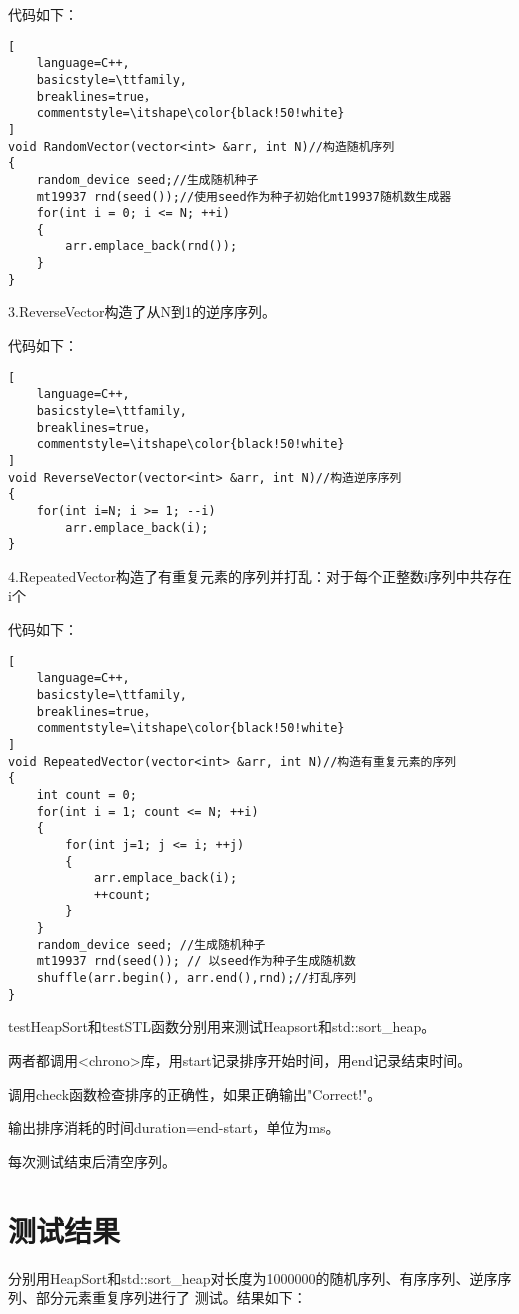 \documentclass[UTF8]{ctexart}
\begin{document}
代码如下：

\begin{lstlisting}[
    language=C++,
    basicstyle=\ttfamily,
    breaklines=true，
    commentstyle=\itshape\color{black!50!white}
]
void RandomVector(vector<int> &arr, int N)//构造随机序列
{
    random_device seed;//生成随机种子
    mt19937 rnd(seed());//使用seed作为种子初始化mt19937随机数生成器
    for(int i = 0; i <= N; ++i)
    {
        arr.emplace_back(rnd());
    }
}
\end{lstlisting}

3.ReverseVector构造了从N到1的逆序序列。

代码如下：

\begin{lstlisting}[
    language=C++,
    basicstyle=\ttfamily,
    breaklines=true，
    commentstyle=\itshape\color{black!50!white}
]
void ReverseVector(vector<int> &arr, int N)//构造逆序序列
{
    for(int i=N; i >= 1; --i)
        arr.emplace_back(i);
}
\end{lstlisting}

4.RepeatedVector构造了有重复元素的序列并打乱：对于每个正整数i序列中共存在i个

代码如下：

\begin{lstlisting}[
    language=C++,
    basicstyle=\ttfamily,
    breaklines=true，
    commentstyle=\itshape\color{black!50!white}
]
void RepeatedVector(vector<int> &arr, int N)//构造有重复元素的序列
{
    int count = 0;
    for(int i = 1; count <= N; ++i)
    {
        for(int j=1; j <= i; ++j)
        {
            arr.emplace_back(i);
            ++count;
        }
    }
    random_device seed; //生成随机种子
    mt19937 rnd(seed()); // 以seed作为种子生成随机数
    shuffle(arr.begin(), arr.end(),rnd);//打乱序列
}
\end{lstlisting}
testHeapSort和testSTL函数分别用来测试Heapsort和std::sort\_heap。

两者都调用<chrono>库，用start记录排序开始时间，用end记录结束时间。

调用check函数检查排序的正确性，如果正确输出"Correct!"。

输出排序消耗的时间duration=end-start，单位为ms。

每次测试结束后清空序列。



\section{测试结果}
分别用HeapSort和std::sort\_heap对长度为1000000的随机序列、有序序列、逆序序列、部分元素重复序列进行了
测试。结果如下：
\end{document}
